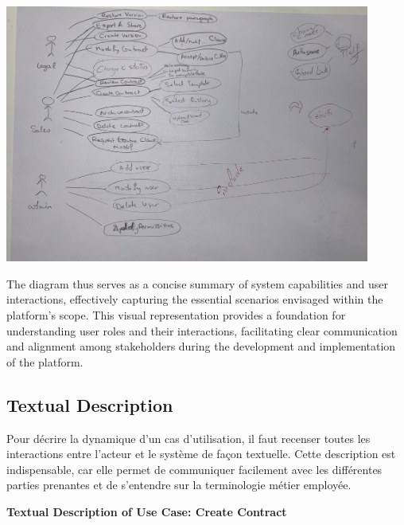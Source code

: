 \begin{center}
    \centering
    \includegraphics[width=0.9\textwidth]{Images/Use Case Diagram.jpg}
     \cite{use_case_diagram}
    \label{fig:use_case_diagram}
\end{center}

The diagram thus serves as a concise summary of system capabilities and user interactions, effectively capturing the essential scenarios envisaged within the platform’s scope. This visual representation provides a foundation for understanding user roles and their interactions, facilitating clear communication and alignment among stakeholders during the development and implementation of the platform.

\subsection{Textual Description}

Pour décrire la dynamique d’un cas d’utilisation, il faut recenser toutes les interactions entre l’acteur et le système de façon textuelle. Cette description est indispensable, car elle permet de communiquer facilement avec les différentes parties prenantes et de s’entendre sur la terminologie métier employée.

\textbf{Textual Description of Use Case: Create Contract}

